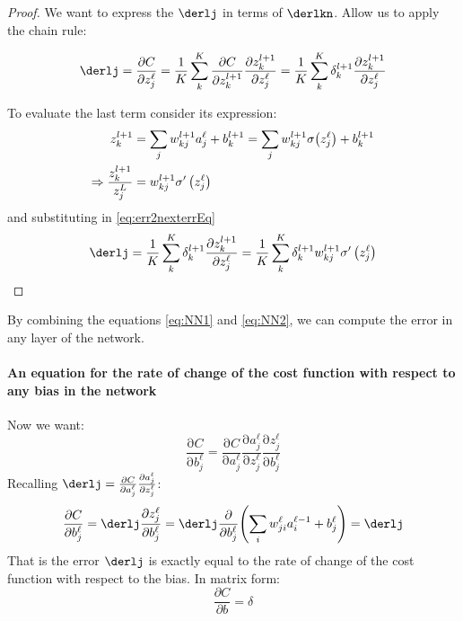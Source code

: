 \documentclass[12pt, letterpaper]{article}
\theoremstyle{definition}
\DeclarePairedDelimiter\autobracket{(}{)}
\newcommand{\br}[1]{\autobracket*{#1}}
\newcommand{\pr}{\mathrm{\partial}}
\begin{document}
\begin{proof}
We want to express the $\derlj$ in terms of $\derlkn$. Allow us to apply the chain rule:

\begin{equation}
\derlj = \frac{\partial C}{\partial z_j^\ell} = \frac{1}{K}\sum_k^K \frac{\partial C}{\partial z_k^{l+1}} \frac{\partial z_k^{l+1}}{\partial z_j^\ell}  = \frac{1}{K}\sum_k^K \delta_k^{l+1} \frac{\partial z_k^{l+1}}{\partial z_j^\ell} 
\label{eq:err2nexterrEq}
\end{equation}

To evaluate the last term consider its expression:
\begin{equation}
\begin{aligned}
z_k^{l+1} &= \sum_j w_{kj}^{l+1}a_j^\ell + b_k^{l+1} = \sum_j w_{kj}^{l+1}\sigma\br{z_j^\ell} + b_k^{l+1}\\
\Rightarrow \frac{z_k^{l+1}}{z_j^{L}} &= w_{kj}^{l+1} \sigma'\left( z_j^\ell\right)
\end{aligned}
\end{equation}
and substituting in \autoref{eq:err2nexterrEq}
\begin{equation}
\derlj = \frac{1}{K}\sum_k^K \delta_k^{l+1} \frac{\partial z_k^{l+1}}{\partial z_j^\ell}  = \frac{1}{K}\sum_k^K \delta_k^{l+1} w_{kj}^{l+1} \sigma'\left( z_j^\ell\right)
\label{eq:NN2}
\end{equation}
\end{proof}

By combining the equations \autoref{eq:NN1} and \autoref{eq:NN2}, we can compute the error in any layer of the network.

\paragraph{An equation for the rate of change of the cost function with respect to any bias in the network}
Now we want:
\begin{equation}
\frac{\pr C}{\pr b_j^\ell} = \frac{\pr C}{\pr a_j^\ell} \frac{\pr a_j^\ell}{\pr z_j^\ell} \frac{\pr z_j^\ell}{\pr b_j^\ell} 
\end{equation}
Recalling $\derlj= \frac{\pr C}{\pr a_j^\ell} \frac{\pr a_j^\ell}{\pr z_j^\ell}$:
\begin{equation}
\frac{\pr C}{\pr b_j^\ell} = \derlj \frac{\pr z_j^\ell}{\pr b_j^\ell} =  \derlj \frac{\pr }{\pr b_j^\ell} \br{\sum_i w_{ji}^\ell a_i^{\ell-1}+b_j^\ell} =  \derlj 
\end{equation}
That is the error $\derlj$ is exactly equal to the rate of change of the cost function with respect to the bias. In matrix form:
\begin{equation}
\frac{\partial C}{\partial b} = \delta
\end{equation}
\end{document}
